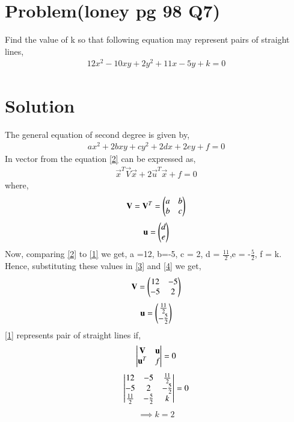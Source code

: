 \documentclass[journal,12pt,twocolumn]{IEEEtran}
\begin{document}
\section{Problem(loney pg 98 Q7)}
Find the value of k so that following equation may represent pairs of straight lines,
\begin{align}
12x^2-10xy+2y^2+11x-5y+k=0
\label{1}
\end{align}
\section{Solution}
The general equation of second degree is given by,
\begin{align}
ax^2 + 2bxy + cy^2 + 2dx +2ey +f = 0
\label{2}
\end{align}
In vector from the equation \eqref{2} can be expressed as,
\begin{align}
\vec{x}^T\vec{V}\vec{x} + 2\vec{u}^T\vec{x} + f = 0 
\label{line_vec}
\end{align}
where,
\begin{align}
\mathbf{V} = \mathbf{V}^T = \begin{pmatrix}a&b\\b&c\end{pmatrix}
\label{3}
\end{align}
\begin{align}
\mathbf{u} = \begin{pmatrix}d\\e\end{pmatrix}
\label{4}
\end{align}
Now, comparing \eqref{2} to \eqref{1} we get, a =12, b=-5, c = 2, d = $\frac{11}{2}$,e = -$\frac{5}{2}$, f = k.  
Hence, substituting these values in \eqref{3} and \eqref{4} we get,
\begin{align}
\mathbf{V} = \begin{pmatrix}12 & -5 \\ -5 & 2\end{pmatrix}
\end{align}
\begin{align}
\mathbf{u} = \begin{pmatrix}\frac{11}{2} \\ -\frac{5}{2}\end{pmatrix}
\end{align}
\eqref{1} represents pair of straight lines if,
\begin{align}
\begin{vmatrix}\mathbf{V}&\mathbf{u}\\\mathbf{u}^T&f\end{vmatrix} = 0
\end{align}
\begin{align}
\begin{vmatrix}12&-5&\frac{11}{2}\\-5&2&-\frac{5}{2}\\\frac{11}{2}&-\frac{5}{2}&k\end{vmatrix} = 0
\end{align}
\begin{align}
\implies k =2
\label{5}
\end{align}
\end{document}
